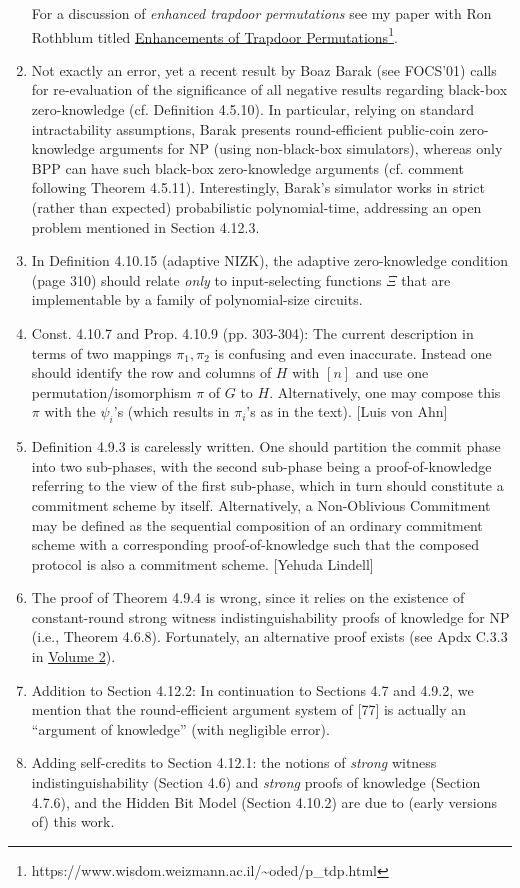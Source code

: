 \documentclass[10pt,a4paper]{article}
\begin{document}
\begin{enumerate}
	For a discussion of \textit{enhanced trapdoor permutations} see my paper with Ron Rothblum titled \href{https://www.wisdom.weizmann.ac.il/~oded/p_tdp.html}{Enhancements of Trapdoor Permutations}\footnote{\label{tdp}https://www.wisdom.weizmann.ac.il/\textasciitilde oded/p\_tdp.html}.
	\item Not exactly an error, yet a recent result by Boaz Barak (see FOCS'01) calls for re-evaluation of the significance of all negative results regarding black-box zero-knowledge (cf. Definition 4.5.10). In particular, relying on standard intractability assumptions, Barak presents round-efficient public-coin zero-knowledge arguments for NP (using non-black-box simulators), whereas only BPP can have such black-box zero-knowledge arguments (cf. comment following Theorem 4.5.11). Interestingly, Barak's simulator works in strict (rather than expected) probabilistic polynomial-time, addressing an open problem mentioned in Section 4.12.3.
	\item In Definition 4.10.15 (adaptive NIZK), the adaptive zero-knowledge condition (page 310) should relate \textit{only} to input-selecting functions $\Xi$ that are implementable by a family of polynomial-size circuits.
	\item Const. 4.10.7 and Prop. 4.10.9 (pp. 303-304): The current description in terms of two mappings $\pi_1,\pi_2$ is confusing and even inaccurate. Instead one should identify the row and columns of $H$ with $[n]$ and use one permutation/isomorphism $\pi$ of $G$ to $H$. Alternatively, one may compose this $\pi$ with the $\psi_i$'s (which results in $\pi_i$'s as in the text). [Luis von Ahn]
	\item Definition 4.9.3 is carelessly written. One should partition the commit phase into two sub-phases, with the second sub-phase being a proof-of-knowledge referring to the view of the first sub-phase, which in turn should constitute a commitment scheme by itself. Alternatively, a Non-Oblivious Commitment may be defined as the sequential composition of an ordinary commitment scheme with a corresponding proof-of-knowledge such that the composed protocol is also a commitment scheme. [Yehuda Lindell]
	\item The proof of Theorem 4.9.4 is wrong, since it relies on the existence of constant-round strong witness indistinguishability proofs of knowledge for NP (i.e., Theorem 4.6.8). Fortunately, an alternative proof exists (see Apdx C.3.3 in \href{https://www.wisdom.weizmann.ac.il/~oded/foc-vol2.html}{Volume 2}).
	\item Addition to Section 4.12.2: In continuation to Sections 4.7 and 4.9.2, we mention that the round-efficient argument system of [77] is actually an ``argument of knowledge'' (with negligible error).
	\item Adding self-credits to Section 4.12.1: the notions of \textit{strong} witness indistinguishability (Section 4.6) and \textit{strong} proofs of knowledge (Section 4.7.6), and the Hidden Bit Model (Section 4.10.2) are due to (early versions of) this work.
\end{enumerate}
\end{document}
